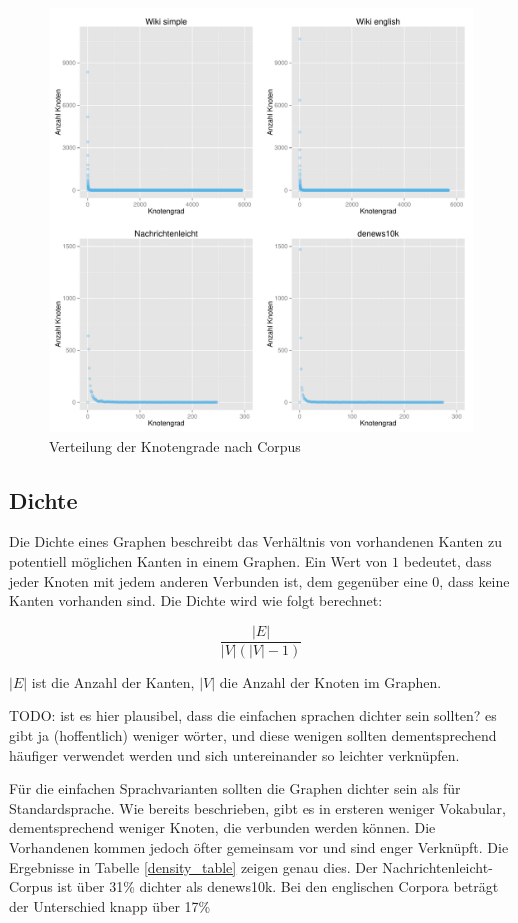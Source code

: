 \documentclass[11pt, a4paper]{article}
\begin{document}
\begin{figure}
    \centering
        \includegraphics[scale=.5]{vdeg_plots.pdf}
    \caption{Verteilung der Knotengrade nach Corpus}
    \label{fig-vdeg}
\end{figure}


\subsection{Dichte}

Die Dichte eines Graphen beschreibt das Verhältnis von vorhandenen Kanten zu
potentiell möglichen Kanten in einem Graphen. Ein Wert von $1$ bedeutet, dass
jeder Knoten mit jedem anderen Verbunden ist, dem gegenüber eine $0$, dass keine
Kanten vorhanden sind. Die Dichte wird wie folgt berechnet:

$$
    \frac{|E|}{|V|(|V|-1)}
$$

$|E|$ ist die Anzahl der Kanten, $|V|$ die Anzahl der Knoten im Graphen. 

TODO: ist es hier plausibel, dass die einfachen sprachen dichter sein sollten?
es gibt ja (hoffentlich) weniger wörter, und diese wenigen sollten
dementsprechend häufiger verwendet werden und sich untereinander so leichter
verknüpfen.

Für die einfachen Sprachvarianten sollten die Graphen dichter sein als für
Standardsprache.
Wie bereits beschrieben, gibt es in ersteren weniger Vokabular, dementsprechend
weniger Knoten, die verbunden werden können. Die Vorhandenen kommen jedoch öfter 
gemeinsam vor und sind enger Verknüpft. Die Ergebnisse in Tabelle \ref{density_table}
zeigen genau dies. Der Nachrichtenleicht-Corpus ist über 31\% dichter als denews10k.
Bei den englischen Corpora beträgt der Unterschied knapp über 17\%
\end{document}
